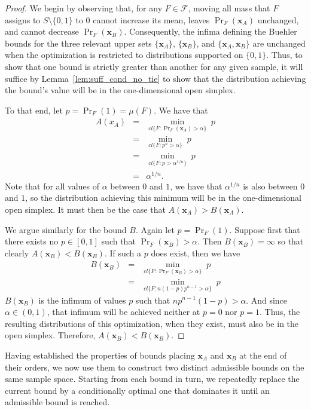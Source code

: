 \documentclass{article}
\theoremstyle{definition}
\theoremstyle{remark}
\def\x{\mathbf{x}}
\begin{document}
\begin{proof}
    We begin by observing that, for any $F \in \mathcal{F}$, moving all mass that $F$ assigns to $S \setminus \{0,1\}$ to 0 cannot increase its mean, leaves $\Pr_F(\x_A)$ unchanged, and cannot decrease $\Pr_F(\x_B)$. Consequently, the infima defining the Buehler bounds for the three relevant upper sets $\{\x_A\}$, $\{\x_B\}$, and $\{\x_A,\x_B\}$ are unchanged when the optimization is restricted to distributions supported on $\{0,1\}$. Thus, to show that one bound is strictly greater than another for any given sample, it will suffice by Lemma~\ref{lem:suff_cond_no_tie} to show that the distribution achieving the bound's value will be in the one-dimensional open simplex. 
    
    To that end, let $p = \Pr_F(1) = \mu(F)$. We have that 
    \begin{eqnarray}
    A(x_A)&=&\min_{cl\{F: \Pr\nolimits_F(\x_A)> \alpha\}} \;p\\
    &=& \min_{cl\{F: p^n> \alpha\}} \;p \\
    &=& \min_{cl\{F: p> \alpha^{1/n}\}}\; p \\
    &=& \alpha^{1/n}.
    \end{eqnarray}
    Note that for all values of $\alpha$ between $0$ and $1$, we have that $\alpha^{1/n}$ is also between $0$ and $1$, so the distribution achieving this minimum will be in the one-dimensional open simplex. It must then be the case that $A(\x_A)>B(\x_A)$.

    We argue similarly for the bound $B$. Again let $p = \Pr_F(1)$. Suppose first that there exists no $p \in [0,1]$ such that $\Pr_F(\x_B)> \alpha$. Then $B(\x_B) = \infty$ so that clearly $A(\x_B) < B(\x_B)$. If such a $p$ does exist, then we have
    \begin{eqnarray}
    B(\x_B)&=&\min_{cl\{F: \Pr\nolimits_F(\x_B)> \alpha\}} \; p\\
    &=& \min_{cl\{F: n(1-p)p^{n-1} > \alpha\}} \; p
    \end{eqnarray}
    $B(\x_B)$ is the infimum of values $p$ such that $n p^{n-1} (1-p) > \alpha$. And since $\alpha \in (0,1)$, that infimum will be achieved neither at $p=0$ nor $p=1$. Thus, the resulting distributions of this optimization, when they exist, must also be in the open simplex. Therefore, $A(\x_B) < B(\x_B)$.
\end{proof}

Having established the properties of bounds placing $\x_A$ and $\x_B$ at the end of their orders, we now use them to construct two distinct admissible bounds on the same sample space. Starting from each bound in turn, we repeatedly replace the current bound by a conditionally optimal one that dominates it until an admissible bound is reached.
\end{document}
